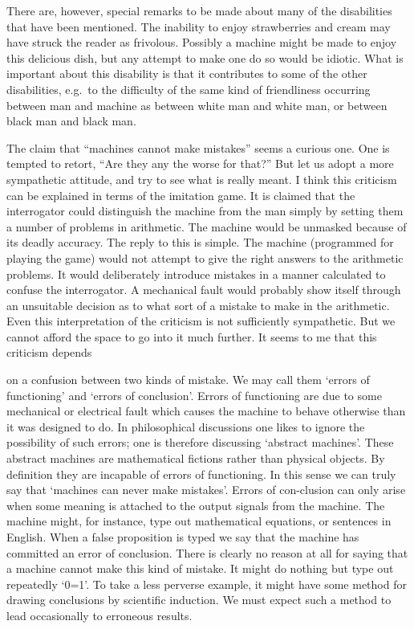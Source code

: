 \documentclass[10pt]{article} %
\begin{document}
There are, however, special remarks to be made about many of the disabilities that have been mentioned. The inability to enjoy strawberries and cream may have struck the reader as frivolous. Possibly a machine might be made to enjoy this delicious dish, but any attempt to make one do so would be idiotic. What is important about this disability is that it contributes to some of the other disabilities, e.g.~to the difficulty of the same kind of friendliness occurring between man and machine as between white man and white man, or between black man and black man.

The claim that ``machines cannot make mistakes'' seems a curious one. One is tempted to retort, ``Are they any the worse for that?'' But let us adopt a more sympathetic attitude, and try to see what is really meant. I think this criticism can be explained in terms of the imitation game. It is claimed that the interrogator could distinguish the machine from the man simply by setting them a number of problems in arithmetic. The machine would be unmasked because of its deadly accuracy. The reply to this is simple. The machine (programmed for playing the game) would not attempt to give the right answers to the arithmetic problems. It would deliberately introduce mistakes in a manner calculated to confuse the interrogator. A mechanical fault would probably show itself through an unsuitable decision as to what sort of a mistake to make in the arithmetic. Even this interpretation of the criticism is not sufficiently sympathetic. But we cannot afford the space to go into it much further. It seems to me that this criticism depends

on a confusion between two kinds of mistake. We may call them `errors of functioning' and `errors of conclusion'. Errors of functioning are due to some mechanical or electrical fault which causes the machine to behave otherwise than it was designed to do. In philosophical discussions one likes to ignore the possibility of such errors; one is therefore discussing `abstract machines'. These abstract machines are mathematical fictions rather than physical objects. By definition they are incapable of errors of functioning. In this sense we can truly say that `machines can never make mistakes'. Errors of con-clusion can only arise when some meaning is attached to the output signals from the machine. The machine might, for instance, type out mathematical equations, or sentences in English. When a false proposition is typed we say that the machine has committed an error of conclusion. There is clearly no reason at all for saying that a machine cannot make this kind of mistake. It might do nothing but type out repeatedly `0=1'. To take a less perverse example, it might have some method for drawing conclusions by scientific induction. We must expect such a method to lead occasionally to erroneous results.
\end{document}
